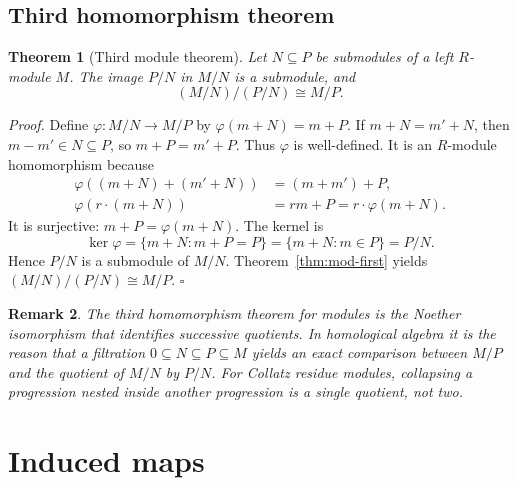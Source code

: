 \documentclass[11pt,letterpaper]{article}
\newcommand{\Map}[3]{#1 \colon #2 \to #3}
\newtheorem{theorem}{Theorem}
\newtheorem{remark}[theorem]{Remark}
\newenvironment{proof}{\noindent\textit{Proof.}}{\hfill\(\square\)}
\begin{document}
\subsection{Third homomorphism theorem}

\begin{theorem}[Third module theorem]
\label{thm:mod-third}
Let \(N\subseteq P\) be submodules of a left \(R\)-module \(M\). The image \(P/N\) in \(M/N\) is a submodule, and
\[
(M/N)/(P/N) \cong M/P.
\]
\end{theorem}

\begin{proof}
Define \(\Map{\varphi}{M/N}{M/P}\) by \(\varphi(m+N)=m+P\). If \(m+N=m'+N\), then \(m-m'\in N\subseteq P\), so \(m+P=m'+P\). Thus \(\varphi\) is well-defined. It is an \(R\)-module homomorphism because
\[
\begin{aligned}
\varphi((m+N)+(m'+N))&=(m+m')+P,\\
\varphi(r\cdot(m+N))&=rm+P=r\cdot\varphi(m+N).
\end{aligned}
\]
It is surjective: \(m+P=\varphi(m+N)\). The kernel is
\[
\ker\varphi=\{m+N:m+P=P\}=\{m+N:m\in P\}=P/N.
\]
Hence \(P/N\) is a submodule of \(M/N\). Theorem~\ref{thm:mod-first} yields \((M/N)/(P/N)\cong M/P\).
\end{proof}

\begin{center}
\end{center}

\begin{remark}
The third homomorphism theorem for modules is the Noether isomorphism that identifies successive quotients. In homological algebra it is the reason that a filtration \(0\subseteq N\subseteq P\subseteq M\) yields an exact comparison between \(M/P\) and the quotient of \(M/N\) by \(P/N\). For Collatz residue modules, collapsing a progression nested inside another progression is a single quotient, not two.
\end{remark}

\section{Induced maps}
\end{document}
